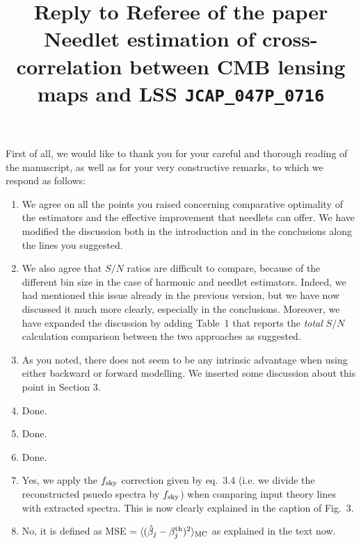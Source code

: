 \documentclass[a4paper,11pt]{article}
\title{Reply to Referee of the paper Needlet estimation of cross-correlation between CMB lensing maps and LSS \texttt{JCAP\_047P\_0716} }
\begin{document}
\maketitle
\flushbottom

\section{}
First of all, we would like to thank you for your careful and thorough reading of the manuscript, as well as for your very constructive remarks, to which we respond as follows:
\begin{enumerate}
\item{ We agree on all the points you raised concerning comparative optimality of the estimators and the effective improvement that needlets can offer. We have modified the discussion both in the introduction and in the conclusions along the lines you suggested.}

\item{  We also agree that $S/N$ ratios are difficult to compare, because of the different bin size in the case of harmonic and needlet estimators. Indeed, we had mentioned this issue already in the previous version, but we have now discussed it much more clearly, especially in the conclusions. Moreover, we have expanded the discussion by adding Table~1 that reports the \textit{total} $S/N$ calculation comparison between the two approaches as suggested.}
  
\item{As you noted, there does not seem to be any intrinsic advantage when using either backward or forward modelling. We inserted some discussion about this point in Section 3.}

\item{ Done.}

\item{  Done.}

\item{  Done.}

\item{  Yes, we apply the $f_{\rm sky}$ correction given by eq.~3.4 (i.e. we divide the reconstructed psuedo spectra by $f_{\rm sky}$) when comparing input theory lines with extracted spectra. This is now clearly explained in the caption of Fig.~3.}

\item{  No, it is defined as MSE $= \langle (\hat{\beta}_j - \beta_j^{\rm th})^2 \rangle_{\rm MC}$ as explained in the text now.}


\end{enumerate}
\end{document}
